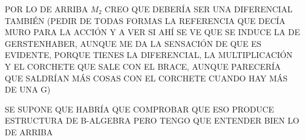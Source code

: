 \documentclass[TFM.tex]{subfiles}
\begin{document}
POR LO DE ARRIBA $M_2$ CREO QUE DEBERÍA SER UNA DIFERENCIAL TAMBIÉN (PEDIR DE TODAS FORMAS LA REFERENCIA QUE DECÍA MURO PARA LA ACCIÓN Y A VER SI AHÍ SE VE QUE SE INDUCE LA DE GERSTENHABER, AUNQUE ME DA LA SENSACIÓN DE QUE ES EVIDENTE, PORQUE TIENES LA DIFERENCIAL, LA MULTIPLICACIÓN Y EL CORCHETE QUE SALE CON EL BRACE, AUNQUE PARECERÍA QUE SALDRÍAN MÁS COSAS CON EL CORCHETE CUANDO HAY MÁS DE UNA G)

SE SUPONE QUE HABRÍA QUE COMPROBAR QUE ESO PRODUCE ESTRUCTURA DE B-ALGEBRA PERO TENGO QUE ENTENDER BIEN LO DE ARRIBA
\end{document}
